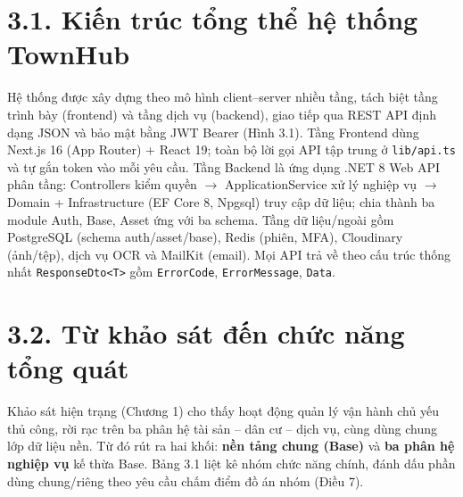 \section*{3.1. Kiến trúc tổng thể hệ thống TownHub}
Hệ thống được xây dựng theo mô hình client--server nhiều tầng, tách biệt tầng trình bày (frontend) và tầng dịch vụ (backend), giao tiếp qua REST API định dạng JSON và bảo mật bằng JWT Bearer (Hình 3.1). Tầng Frontend dùng Next.js 16 (App Router) + React 19; toàn bộ lời gọi API tập trung ở \texttt{lib/api.ts} và tự gắn token vào mỗi yêu cầu. Tầng Backend là ứng dụng .NET 8 Web API phân tầng: Controllers kiểm quyền $\rightarrow$ ApplicationService xử lý nghiệp vụ $\rightarrow$ Domain + Infrastructure (EF Core 8, Npgsql) truy cập dữ liệu; chia thành ba module Auth, Base, Asset ứng với ba schema. Tầng dữ liệu/ngoài gồm PostgreSQL (schema auth/asset/base), Redis (phiên, MFA), Cloudinary (ảnh/tệp), dịch vụ OCR và MailKit (email). Mọi API trả về theo cấu trúc thống nhất \texttt{ResponseDto<T>} gồm \texttt{ErrorCode}, \texttt{ErrorMessage}, \texttt{Data}.


\section*{3.2. Từ khảo sát đến chức năng tổng quát}
Khảo sát hiện trạng (Chương 1) cho thấy hoạt động quản lý vận hành chủ yếu thủ công, rời rạc trên ba phân hệ tài sản -- dân cư -- dịch vụ, cùng dùng chung lớp dữ liệu nền. Từ đó rút ra hai khối: \textbf{nền tảng chung (Base)} và \textbf{ba phân hệ nghiệp vụ} kế thừa Base. Bảng 3.1 liệt kê nhóm chức năng chính, đánh dấu phần dùng chung/riêng theo yêu cầu chấm điểm đồ án nhóm (Điều 7).

